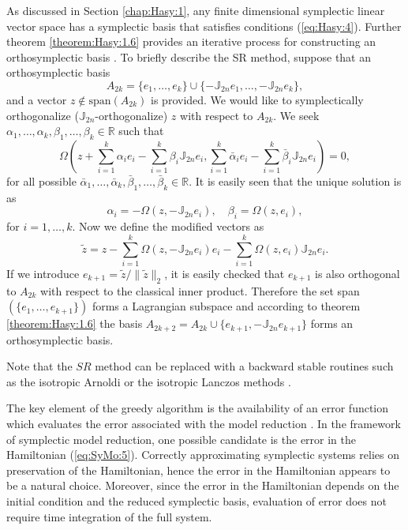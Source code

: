 {\edit
As discussed in Section \ref{chap:Hasy:1}, any finite dimensional symplectic linear vector space has a symplectic basis that satisfies conditions (\ref{eq:Hasy:4}). Further theorem \ref{theorem:Hasy:1.6} provides an iterative process for constructing an orthosymplectic basis \cite{Matsuo:2014wl,Salam2014}. To briefly describe the SR method, suppose that an orthosymplectic basis
\begin{equation} \label{eq:SyMo:14.1}
	A_{2k}=\{ e_1 , \dots , e_k \} \cup \{ -\mathbb J_{2n} e_1 , \dots , -\mathbb J_{2n} e_k \},
\end{equation}
and a vector $z\not \in \text{span}(A_{2k})$ is provided. We would like to symplectically orthogonalize ($\mathbb J_{2n}$-orthogonalize) $z$ with respect to $A_{2k}$. We seek $\alpha_1,\dots,\alpha_k,\beta_1,\dots,\beta_k \in \mathbb R$ such that
\begin{equation} \label{eq:SyMo:14.2}
	\Omega\left(z + \sum_{i=1}^k \alpha_i e_i - \sum_{i=1}^k \beta_i \mathbb J_{2n}e_i , \sum_{i=1}^k \bar{\alpha}_i e_i - \sum_{i=1}^k \bar{\beta}_i \mathbb J_{2n}e_i \right) = 0,
\end{equation}
for all possible $\bar{\alpha}_1,\dots,\bar{\alpha}_k,\bar{\beta}_1,\dots,\bar{\beta}_k \in \mathbb R$. It is easily seen that the unique solution is as 
\begin{equation} \label{eq:SyMo:14.3}
	\alpha_i = - \Omega(z,-\mathbb J_{2n}e_i), \quad \beta_i = \Omega(z,e_i),
\end{equation}
for $i=1,\dots,k$. Now we define the modified vectors as
\begin{equation} \label{eq:SyMo:14.4}
	\tilde z = z - \sum_{i=1}^k \Omega(z,-\mathbb J_{2n}e_i) e_i - \sum_{i=1}^k \Omega(z,e_i) \mathbb J_{2n}e_i.
\end{equation}
If we introduce $e_{k+1} = \tilde z / \| \tilde z \|_2$, it is easily checked that $e_{k+1}$ is also orthogonal to $A_{2k}$ with respect to the classical inner product. Therefore the set span$(\{e_1,\dots,e_{k+1}\})$ forms a Lagrangian subspace and according to theorem \ref{theorem:Hasy:1.6} the basis $A_{2k+2}= A_{2k}\cup \{ e_{k+1} , -\mathbb J_{2n} e_{k+1} \}$ forms an orthosymplectic basis.

Note that the $SR$ method can be replaced with a backward stable routines such as the isotropic Arnoldi or the isotropic Lanczos methods \cite{Mehrmann:2000dv}.
}

The key element of the greedy algorithm is the availability of an error function which evaluates the error associated with the model reduction \cite{Anonymous:2016wl}. In the framework of symplectic model reduction, one possible candidate is the error in the Hamiltonian (\ref{eq:SyMo:5}). Correctly approximating symplectic systems relies on preservation of the Hamiltonian, hence the error in the Hamiltonian appears to be a natural choice. Moreover, since the error in the Hamiltonian depends on the initial condition and the reduced symplectic basis, evaluation of error does not require time integration of the full system. 

